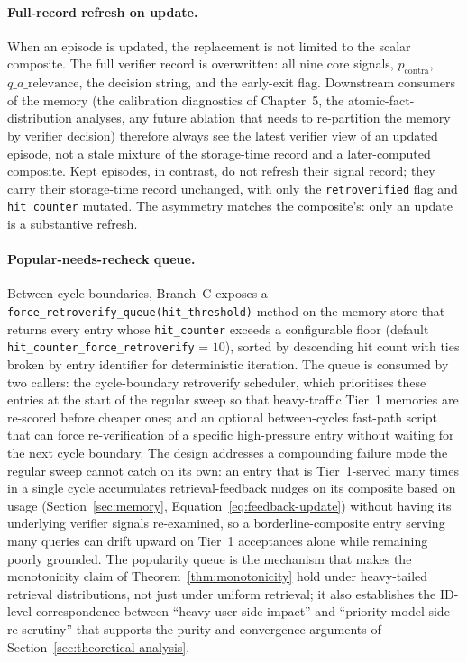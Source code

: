 \paragraph{Full-record refresh on update.}
When an episode is updated, the replacement is not limited to the scalar composite. The full verifier record is overwritten: all nine core signals, $p_{\text{contra}}$, $q\_a\_\text{relevance}$, the decision string, and the early-exit flag. Downstream consumers of the memory (the calibration diagnostics of Chapter~5, the atomic-fact-distribution analyses, any future ablation that needs to re-partition the memory by verifier decision) therefore always see the latest verifier view of an updated episode, not a stale mixture of the storage-time record and a later-computed composite. Kept episodes, in contrast, do not refresh their signal record; they carry their storage-time record unchanged, with only the \texttt{retroverified} flag and \texttt{hit\_counter} mutated. The asymmetry matches the composite's: only an update is a substantive refresh.

\paragraph{Popular-needs-recheck queue.}
Between cycle boundaries, Branch~C exposes a \texttt{force\_retroverify\_queue(hit\_threshold)} method on the memory store that returns every entry whose \texttt{hit\_counter} exceeds a configurable floor (default \texttt{hit\_counter\_force\_retroverify} = $10$), sorted by descending hit count with ties broken by entry identifier for deterministic iteration. The queue is consumed by two callers: the cycle-boundary retroverify scheduler, which prioritises these entries at the start of the regular sweep so that heavy-traffic Tier~1 memories are re-scored before cheaper ones; and an optional between-cycles fast-path script that can force re-verification of a specific high-pressure entry without waiting for the next cycle boundary. The design addresses a compounding failure mode the regular sweep cannot catch on its own: an entry that is Tier~1-served many times in a single cycle accumulates retrieval-feedback nudges on its composite based on usage (Section~\ref{sec:memory}, Equation~\ref{eq:feedback-update}) without having its underlying verifier signals re-examined, so a borderline-composite entry serving many queries can drift upward on Tier~1 acceptances alone while remaining poorly grounded. The popularity queue is the mechanism that makes the monotonicity claim of Theorem~\ref{thm:monotonicity} hold under heavy-tailed retrieval distributions, not just under uniform retrieval; it also establishes the ID-level correspondence between ``heavy user-side impact'' and ``priority model-side re-scrutiny'' that supports the purity and convergence arguments of Section~\ref{sec:theoretical-analysis}.

